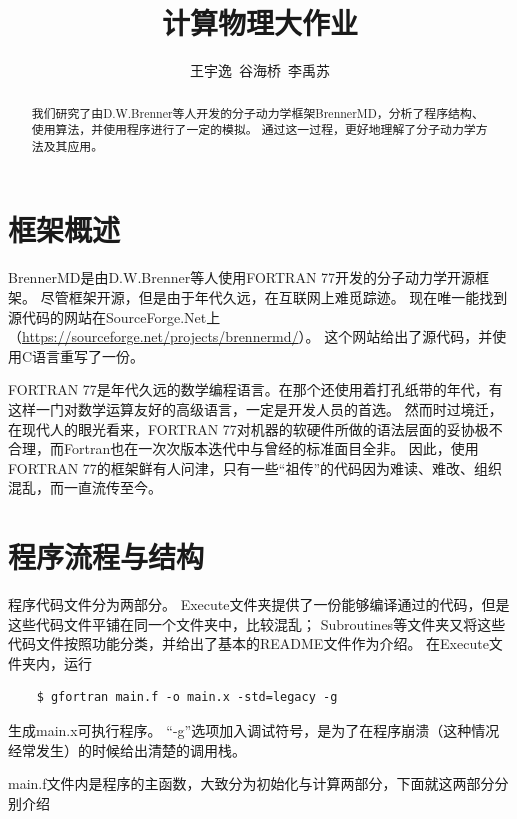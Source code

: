 \documentclass{ctexart}
\title{计算物理大作业}
\author{王宇逸\ 谷海桥\ 李禹苏}
\begin{document}
\maketitle
\newpage
\tableofcontents
\newpage

\begin{abstract}
    我们研究了由D.W.Brenner等人开发的分子动力学框架BrennerMD，分析了程序结构、使用算法，并使用程序进行了一定的模拟。
    通过这一过程，更好地理解了分子动力学方法及其应用。
\end{abstract}

\section{框架概述}
BrennerMD是由D.W.Brenner等人使用FORTRAN 77开发的分子动力学开源框架。
尽管框架开源，但是由于年代久远，在互联网上难觅踪迹。
现在唯一能找到源代码的网站在SourceForge.Net上（\url{https://sourceforge.net/projects/brennermd/}）。
这个网站给出了源代码，并使用C语言重写了一份。

FORTRAN 77是年代久远的数学编程语言。在那个还使用着打孔纸带的年代，有这样一门对数学运算友好的高级语言，一定是开发人员的首选。
然而时过境迁，在现代人的眼光看来，FORTRAN 77对机器的软硬件所做的语法层面的妥协极不合理，而Fortran也在一次次版本迭代中与曾经的标准面目全非。
因此，使用FORTRAN 77的框架鲜有人问津，只有一些“祖传”的代码因为难读、难改、组织混乱，而一直流传至今。

\section{程序流程与结构}
程序代码文件分为两部分。
Execute文件夹提供了一份能够编译通过的代码，但是这些代码文件平铺在同一个文件夹中，比较混乱；
Subroutines等文件夹又将这些代码文件按照功能分类，并给出了基本的README文件作为介绍。
在Execute文件夹内，运行
\begin{verbatim}
    $ gfortran main.f -o main.x -std=legacy -g
\end{verbatim}
生成main.x可执行程序。
“-g”选项加入调试符号，是为了在程序崩溃（这种情况经常发生）的时候给出清楚的调用栈。

main.f文件内是程序的主函数，大致分为初始化与计算两部分，下面就这两部分分别介绍
\end{document}

